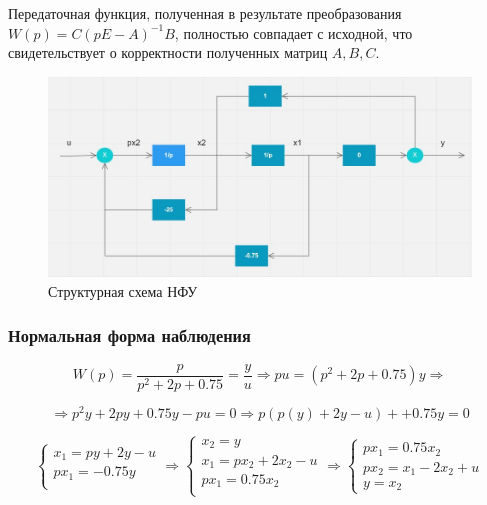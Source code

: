 \documentclass[14pt,a4paper,report]{report}
\begin{document}
Передаточная функция, полученная в результате преобразования $W(p)=C(pE-A)^{-1}B$, полностью совпадает с исходной, что свидетельствует о корректности полученных матриц  $A, B, C$. 


\begin{figure}[h!]
	\centering
	\includegraphics[scale = 0.73]{images/nfu.jpg}
	\caption{Структурная схема НФУ}
	\label{image:1}
\end{figure}

\subsubsection{Нормальная форма наблюдения}

\begin{equation*}
\text{$W(p)=\frac{p}{p^2+2p+0.75}=\frac{y}{u}$}
\Longrightarrow
\text{$pu=(p^2+2p+0.75)y$}
\Longrightarrow
\end{equation*}

\begin{equation*}
\Longrightarrow
\text{$p^2y+2py+0.75y - pu =0$}
\Longrightarrow
\text{$p(p(y)+2y-u)++0.75y=0$}
\end{equation*}

\begin{equation*}
\begin{cases}
	\text{$x_1=py+2y-u$} \\
	\text{$px_1=-0.75y$} \\
\end{cases}
\Longrightarrow
\begin{cases}
	\text{$x_2=y$}\\
	\text{$x_1=px_2+2x_2-u$} \\
	\text{$px_1=0.75x_2$} \\
\end{cases}
\Longrightarrow
\begin{cases}
	\text{$px_1=0.75x_2$} \\
	\text{$px_2=x_1-2x_2+u$} \\
	\text{$y=x_2$}
\end{cases}
\end{equation*}
\end{document}
